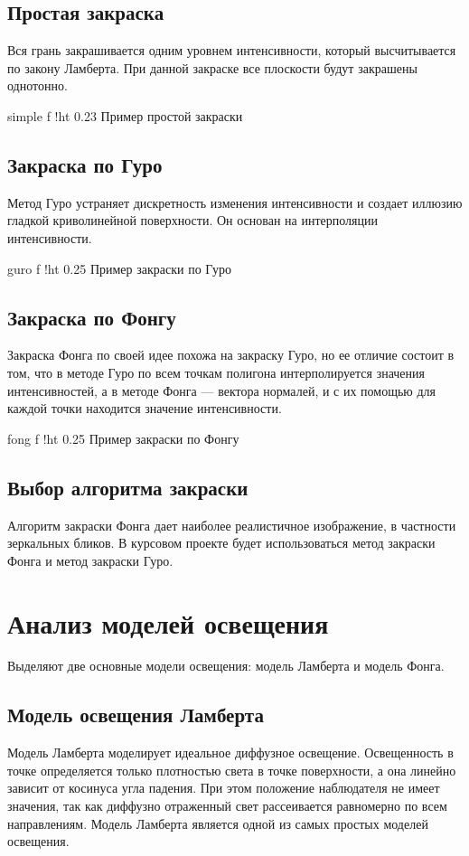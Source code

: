 \subsection{Простая закраска}
Вся грань закрашивается одним уровнем интенсивности, который высчитывается по закону Ламберта. 
При данной закраске все плоскости будут закрашены однотонно.

    {simple}
    {f}
    {!ht}
    {0.23\textwidth}
    {Пример простой закраски}

\subsection{Закраска по Гуро}
Метод Гуро устраняет дискретность изменения интенсивности и создает
иллюзию гладкой криволинейной поверхности. Он основан на интерполяции интенсивности. 

    {guro}
    {f}
    {!ht}
    {0.25\textwidth}
    {Пример закраски по Гуро}

\subsection{Закраска по Фонгу}
Закраска Фонга по своей идее похожа на закраску Гуро, но ее отличие состоит в том, 
что в методе Гуро по всем точкам полигона интерполируется значения интенсивностей, 
а в методе Фонга --- вектора нормалей, и с их помощью для каждой точки находится значение интенсивности.

    {fong}
    {f}
    {!ht}
    {0.25\textwidth}
    {Пример закраски по Фонгу}

\subsection{Выбор алгоритма закраски}
Алгоритм закраски Фонга дает наиболее реалистичное изображение, в частности зеркальных бликов. 
В курсовом проекте будет использоваться метод закраски Фонга и метод закраски Гуро.

\newpage

\section{Анализ моделей освещения}
Выделяют две основные модели освещения: модель Ламберта и модель Фонга. 

\subsection{Модель освещения Ламберта}
Модель Ламберта моделирует идеальное диффузное освещение.
Освещенность в точке определяется только плотностью света в точке поверхности, а она линейно зависит от косинуса угла падения. 
При этом положение наблюдателя не имеет значения, так как диффузно отраженный свет рассеивается равномерно по всем направлениям.
Модель Ламберта является одной из самых простых моделей освещения. 

